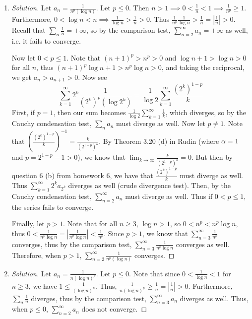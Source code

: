 \documentclass{article}
\begin{document}
\begin{enumerate}
\begin{proof}[Solution]
		Now, since $0 < \log{3} \leq \log{n}$ for $n \geq 3$,
		we have $0 < \frac{1}{\log{n}} < \frac{1}{\log{3}}
		\implies 0 < \frac{1}{(\log{n})^n} < \frac{1}{(\log{3})^n}$,
		thus $b_n \geq a_n = |a_n| \geq 0$ for all $n$,
		and thus by the comparison test,
		$\sum_{n=2}^\infty a_n$ must converge as well.
		(This is true regardless of $p$; it was not used.)
	\end{proof}
	\item \begin{proof}[Solution]\let\qed\relax
		Let $a_n = \frac{1}{n^p(\log{n})}$.
		Let $p \leq 0$.
		Then $n > 1 \implies 0 < \frac{1}{n} < 1
		\implies \frac{1}{n^p} \geq 1$.
		Furthermore, $0 < \log{n} < n \implies \frac{1}{\log{n}} > \frac{1}{n} > 0$.
		Thus $\frac{1}{n^p}\frac{1}{\log{n}} > \frac{1}{n}
		= \left\lvert \frac{1}{n}\right\rvert > 0$.
		Recall that $\sum_n \frac{1}{n} = +\infty$,
		so by the comparison test,
		$\sum_{n=2}^\infty a_n = +\infty$ as well,
		i.e. it fails to converge.

		Now let $0 < p \leq 1$.
		Note that $(n+1)^p > n^p > 0$ and $\log{n+1} > \log{n} > 0$
		for all $n$,
		thus $(n+1)^p\log{n+1} > n^p\log{n} > 0$,
		and taking the reciprocal, we get $a_n > a_{n+1} > 0$.
		Now see
		\[
			\sum_{k=1}^\infty 2^k\frac{1}{(2^k)^p(\log{2^k})}
			= \frac{1}{\log{2}}\sum_{k=1}^\infty\frac{(2^k)^{1-p}}{k}
		\]
		First, if $p = 1$, then our sum becomes
		$\frac{1}{\log{2}}\sum_{k=1}^\infty\frac{1}{k}$,
		which diverges, so by the Cauchy condensation test,
		$\sum_n a_n$ must diverge as well.
		Now let $p \neq 1$.
		Note that $\left(\frac{(2^k)^{1-p}}{k}\right)^{-1}
		= \frac{k}{(2^{1-p})^k}$.
		By Theorem 3.20 (d) in Rudin (where $\alpha = 1$ and $p = 2^{1-p}-1>0$),
		we know that $\lim_{k\to\infty} \frac{k}{(2^{1-p})^k} = 0$.
		But then by question 6 (b) from homework 6,
		we have that $\frac{(2^k)^{1-p}}{k}$ must diverge as well.
		Thus $\sum_{k=1}^\infty 2^ka_{2^k}$ diverges as well
		(crude divergence test).
		Then, by the Cauchy condensation test,
		$\sum_{n=2}^\infty a_n$ must diverge as well.
		Thus if $0 < p \leq 1$, the series fails to converge.

		Finally, let $p > 1$.
		Note that for all $n \geq 3$,
		$\log{n} > 1$,
		so $0 < n^p < n^p \log{n}$, thus $0 < \frac{1}{n^p\log{n}}
		= \left\lvert \frac{1}{n^p\log{n}}\right\rvert < \frac{1}{n^p}$.
		Since $p > 1$,
		we know that $\sum_{n=3}^\infty \frac{1}{n^p}$ converges,
		thus by the comparison test,
		$\sum_{n=3}^\infty \frac{1}{n^p\log{n}}$ converges as well.
		Therefore, when $p > 1$,
		$\sum_{n=2}^\infty \frac{1}{n^p(\log{n})}$ converges.
	\end{proof}
	\item \begin{proof}[Solution]\let\qed\relax
		Let $a_n = \frac{1}{n(\log{n})^p}$.
		Let $p \leq 0$.
		Note that since $0 < \frac{1}{\log{n}} < 1$ for $n \geq 3$,
		we have $1 \leq \frac{1}{(\log{n})^p}$.
		Thus, $\frac{1}{n(\log{n})^p} \geq \frac{1}{n} = \left\lvert \frac{1}{n}\right\rvert > 0$.
		Furthermore, $\sum_n \frac{1}{n}$ diverges,
		thus by the comparison test,
		$\sum_{n=3}^\infty a_n$ diverges as well.
		Thus, when $p \leq 0$, $\sum_{n=2}^\infty a_n$ does not converge.


\end{proof}
\end{enumerate}
\end{document}
